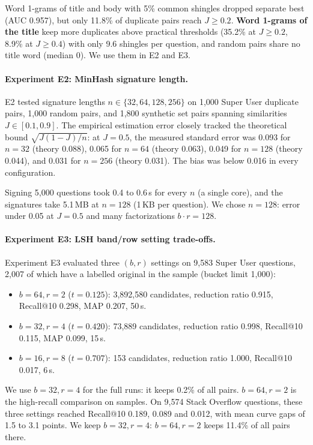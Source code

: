 {Word 1-grams of title and body with 5\% common shingles dropped separate best (AUC 0.957), but only 11.8\% of duplicate
pairs reach $J \ge 0.2$. \textbf{Word 1-grams of the title} keep more duplicates above practical thresholds
(35.2\% at $J \ge 0.2$, 8.9\% at $J \ge 0.4$) with only 9.6 shingles per question, and random pairs share no title word
(median 0). We use them in E2 and E3.

\paragraph{Experiment E2: MinHash signature length.}
E2 tested signature lengths $n \in \{32, 64, 128, 256\}$ on 1,000 Super User duplicate pairs,
1,000 random pairs, and 1,800 synthetic set pairs spanning similarities $J \in [0.1, 0.9]$.
The empirical estimation error closely tracked the theoretical bound $\sqrt{J(1-J)/n}$:
at $J = 0.5$, the measured standard error was 0.093 for $n=32$ (theory 0.088), 0.065 for $n=64$
(theory 0.063), 0.049 for $n=128$ (theory 0.044), and 0.031 for $n=256$ (theory 0.031).
The bias was below 0.016 in every configuration.

Signing 5,000 questions took 0.4 to 0.6\,s for every $n$ (a single core), and the signatures take 5.1\,MB at $n=128$ (1\,KB per question).
We chose $n=128$: error under 0.05 at $J=0.5$ and many factorizations $b \cdot r = 128$.

\paragraph{Experiment E3: LSH band/row setting trade-offs.}
Experiment E3 evaluated three $(b, r)$ settings on 9,583 Super User questions, 2,007 of which have a
labelled original in the sample (bucket limit 1,000):
\begin{itemize}
  \item $b = 64, r = 2$ ($t = 0.125$): 3,892,580 candidates, reduction ratio 0.915,
        Recall@10 0.298, MAP 0.207, 50\,s.
  \item $b = 32, r = 4$ ($t = 0.420$): 73,889 candidates, reduction ratio 0.998,
        Recall@10 0.115, MAP 0.099, 15\,s.
  \item $b = 16, r = 8$ ($t = 0.707$): 153 candidates, reduction ratio 1.000,
        Recall@10 0.017, 6\,s.
\end{itemize}
We use $b = 32, r = 4$ for the full runs: it keeps 0.2\% of all pairs. $b=64, r=2$ is the high-recall comparison on samples.
On 9,574 Stack Overflow questions, these three settings reached Recall@10 0.189, 0.089 and 0.012, with
mean curve gaps of 1.5 to 3.1 points. We keep $b=32, r=4$: $b=64, r=2$ keeps 11.4\% of all pairs there.
}

